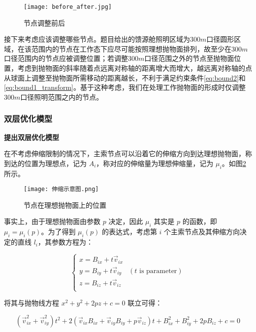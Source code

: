 \documentclass[withoutpreface,bwprint,fontset=macnew]{cumcmthesis} %
\begin{document}
	\begin{figure}[!h]
		\centering
		\texttt{[image: before\_after.jpg]} %
		\caption{节点调整前后}
		\label{fig:before_after}
	\end{figure}
	
	
	接下来考虑应该调整哪些节点。题目给出的馈源舱照明区域为$300m$口径圆形区域，在该范围内的节点在工作态下应尽可能按照理想抛物面排列，故至少在$300m$口径范围内的节点应被调整位置；若调整$300m$口径范围之外的节点至抛物面位置，考虑到抛物面的斜率随着点远离对称轴的距离增大而增大，越远离对称轴的点从球面上调整至抛物面所需移动的距离越长，不利于满足约束条件\ref {eq:bound2}和\ref {eq:bound1_transform}。基于这种考虑，我们在处理工作抛物面的形成时仅调整$300m$口径照明范围之内的节点。

	\subsubsection{双层优化模型}
	
	\textbf{提出双层优化模型}
	
	在不考虑伸缩限制的情况下，主索节点可以沿着它的伸缩方向到达理想抛物面，称到达的位置为理想点，记为 $A_i$，称对应的伸缩量为理想伸缩量，记为 $\mu_i$。如图\ref{fig:g_ideal}所示。
	
	\begin{figure}[!h]
		\centering
		\texttt{[image: 伸缩示意图.png]} %
		\caption{节点在理想抛物面上的位置}
		\label{fig:g_ideal}
	\end{figure}

	事实上，由于理想抛物面由参数 $p$ 决定，因此 $\mu_i$ 其实是 $p$ 的函数，即 $\mu_i=\mu_i(p)$。为了得到 $\mu_i(p)$ 的表达式，考虑第 $i$ 个主索节点及其伸缩方向决定的直线 $l_i$，其参数方程为：
	
	\begin{equation*}
		\begin{cases}
			x=B_{ix}+t\vec{v}_{ix}\\
			y=B_{iy}+t\vec{v}_{iy}&(t \text{ is parameter})\\
			z=B_{iz}+t\vec{v}_{iz}\\
		\end{cases}
	\end{equation*}

	将其与抛物线方程 $x^2+y^2+2pz+c=0$ 联立可得：
	
	\begin{equation*}
		(\vec{v}_{ix}^2+\vec{v}_{iy}^2)t^2+2(\vec{v}_{ix}B_{ix}+\vec{v}_{iy}B_{iy}+p\vec{v}_{iz})t+B_{ix}^2+B_{iy}^2+2pB_{iz}+c=0
	\end{equation*}
\end{document}
